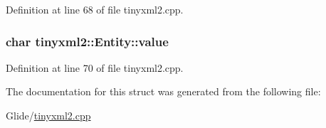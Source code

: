 Definition at line 68 of file tinyxml2.\-cpp.

\hypertarget{structtinyxml2_1_1_entity_a7334e81e33b4615655a403711b24f3ed}{
\subsubsection[{value}]{\setlength{\rightskip}{0pt plus 5cm}char tinyxml2\-::\-Entity\-::value}}\label{structtinyxml2_1_1_entity_a7334e81e33b4615655a403711b24f3ed}


Definition at line 70 of file tinyxml2.\-cpp.



The documentation for this struct was generated from the following file\-:\begin{DoxyCompactItemize}
\item 
Glide/\hyperlink{tinyxml2_8cpp}{tinyxml2.\-cpp}\end{DoxyCompactItemize}
